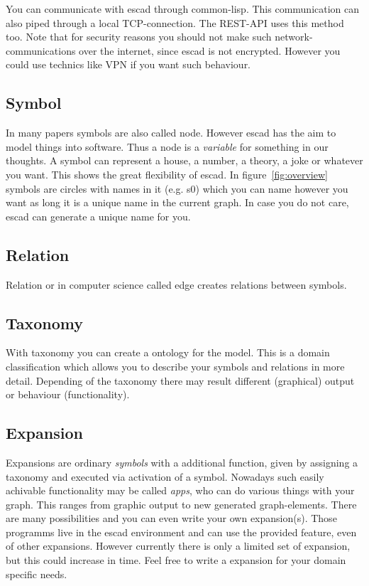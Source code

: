 \documentclass[a4paper, 12pt, openany]{scrbook}
\begin{document}
You can communicate with escad through common-lisp. This communication can also piped through a local TCP-connection. The REST-API uses this method too. Note that for security reasons you should not make such network-communications over the internet, since escad is not encrypted. However you could use technics like VPN if you want such behaviour.
\subsection{Symbol}
In many papers symbols are also called node. However escad has the aim to model things into software. Thus a node is a \emph{variable} for something in our thoughts. A symbol can represent a house, a number, a theory, a joke or whatever you want. This shows the great flexibility of escad. In figure~\ref{fig:overview} symbols are circles with names in it (e.g. s0) which you can name however you want as long it is a unique name in the current graph. In case you do not care, escad can generate a unique name for you.
\subsection{Relation}
Relation or in computer science called edge creates relations between symbols.
\subsection{Taxonomy}
With taxonomy you can create a ontology for the model. This is a domain classification which allows you to describe your symbols and relations in more detail. Depending of the taxonomy there may result different (graphical) output or behaviour (functionality).
\subsection{Expansion}
Expansions are ordinary \emph{symbols} with a additional function, given by assigning a taxonomy and executed via activation of a symbol. Nowadays such easily achivable functionality may be called \emph{apps}, who can do various things with your graph. This ranges from graphic output to new generated graph-elements. There are many possibilities and you can even write your own expansion(s). Those programms live in the escad environment and can use the provided feature, even of other expansions. However currently there is only a limited set of expansion, but this could increase in time. Feel free to write a expansion for your domain specific needs.
\end{document}
